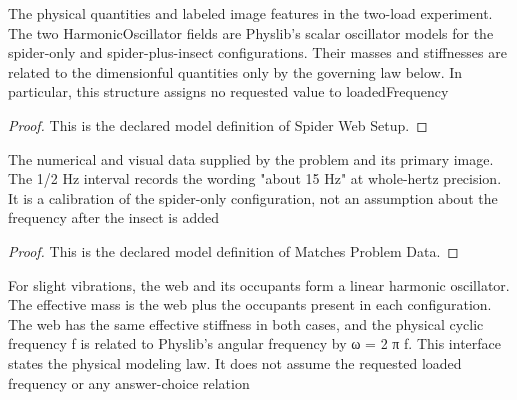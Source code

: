 \begin{definition}
  \label{def:physics:phyx-mini-0200:phyxminiproblems-problemphyxmini0200-spiderwebsetup}
  The physical quantities and labeled image features in the two-load experiment. The two HarmonicOscillator fields are Physlib's scalar oscillator models for the spider-only and spider-plus-insect configurations. Their masses and stiffnesses are related to the dimensionful quantities only by the governing law below. In particular, this structure assigns no requested value to loadedFrequency
\end{definition}
\begin{proof}
  This is the declared model definition of Spider Web Setup.
\end{proof}
\begin{definition}
  \label{def:physics:phyx-mini-0200:phyxminiproblems-problemphyxmini0200-matchesproblemdata}
  The numerical and visual data supplied by the problem and its primary image. The 1/2 Hz interval records the wording "about 15 Hz" at whole-hertz precision. It is a calibration of the spider-only configuration, not an assumption about the frequency after the insect is added
\end{definition}
\begin{proof}
  This is the declared model definition of Matches Problem Data.
\end{proof}
\begin{definition}
  \label{def:physics:phyx-mini-0200:phyxminiproblems-problemphyxmini0200-satisfiessharedharmonicoscillatormodel}
  For slight vibrations, the web and its occupants form a linear harmonic oscillator. The effective mass is the web plus the occupants present in each configuration. The web has the same effective stiffness in both cases, and the physical cyclic frequency f is related to Physlib's angular frequency by ω = 2 π f. This interface states the physical modeling law. It does not assume the requested loaded frequency or any answer-choice relation
\end{definition}
